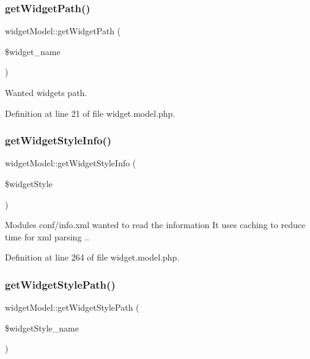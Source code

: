 \subsubsection{\texorpdfstring{get\+Widget\+Path()}{getWidgetPath()}}
{\footnotesize\ttfamily widget\+Model\+::get\+Widget\+Path (\begin{DoxyParamCaption}\item[{}]{\$widget\+\_\+name }\end{DoxyParamCaption})}



Wanted widget\textquotesingle{}s path. 



Definition at line 21 of file widget.\+model.\+php.

\mbox{\label{classwidgetModel_a185fc0ca0bcf22fd6efb045ce8912e47}} 
\subsubsection{\texorpdfstring{get\+Widget\+Style\+Info()}{getWidgetStyleInfo()}}
{\footnotesize\ttfamily widget\+Model\+::get\+Widget\+Style\+Info (\begin{DoxyParamCaption}\item[{}]{\$widget\+Style }\end{DoxyParamCaption})}



Modules conf/info.\+xml wanted to read the information It uses caching to reduce time for xml parsing .. 



Definition at line 264 of file widget.\+model.\+php.

\mbox{\label{classwidgetModel_ae292d21337c4deb9ba7b4c0b4d794f0e}} 
\subsubsection{\texorpdfstring{get\+Widget\+Style\+Path()}{getWidgetStylePath()}}
{\footnotesize\ttfamily widget\+Model\+::get\+Widget\+Style\+Path (\begin{DoxyParamCaption}\item[{}]{\$widget\+Style\+\_\+name }\end{DoxyParamCaption})}



